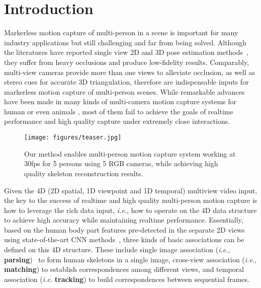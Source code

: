 \documentclass[10pt,twocolumn,letterpaper]{article}
\begin{document}
\section{Introduction}
Markerless motion capture of multi-person in a scene is important for many industry applications but still challenging and far from being solved. Although the literatures have reported single view 2D and 3D pose estimation methods~\cite{wei2016convolutional,pishchulin2016deepcut,cao2018openpose,Chen2018CPN,he2017mask,fang2017rmpe,li2018crowdpose,nie2019single,zanfir2018monocular,zanfir2018deep,singleshotmultiperson2018}, they suffer from heavy occlusions and produce low-fidelity results. Comparably, multi-view cameras provide more than one views to alleviate occlusion, as well as stereo cues for accurate 3D triangulation, therefore are indispensable inputs for markerless motion capture of multi-person scenes. While remarkable advances have been made in many kinds of multi-camera motion capture systems for human \cite{liu2013markerless,liu2011markerless,joo2019panoptic} or even animals \cite{bala2020openmonkeystudio}, most of them fail to achieve the goals of realtime performance and high quality capture under extremely close interactions. 



\begin{figure}
    \centering
    \texttt{[image: figures/teaser.jpg]}
\caption{Our method enables multi-person motion capture system working at 30fps for 5 persons using 5 RGB cameras, while achieving high quality skeleton reconstruction results.}
    \label{fig:teaser}
     \vspace{-2mm}
\end{figure}



Given the 4D (2D spatial, 1D viewpoint and 1D temporal) multiview video input, the key to the success of realtime and high quality multi-person motion capture is how to leverage the rich data input, \textit{i.e.}, how to operate on the 4D data structure to achieve high accuracy while maintaining realtime performance. Essentially, based on the human body part features pre-detected in the separate 2D views using state-of-the-art CNN methods~\cite{cao2018openpose}, three kinds of basic associations can be defined on this 4D structure. These include single image association ({\textit{i.e.}, \bf parsing})~\cite{cao2018openpose,deepercut} to form human skeletons in a single image, cross-view association ({\textit{i.e.}, \bf matching}) to establish correspondences among different views, and temporal association (\textit{i.e.} {\bf tracking}) to build correspondences between sequential frames.
\end{document}
